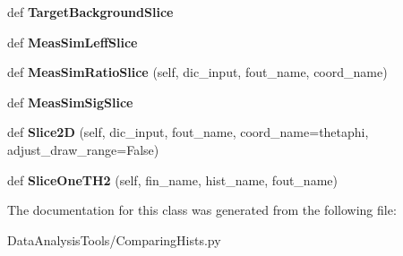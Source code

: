 \begin{DoxyCompactItemize}
def {\bfseries Target\+Background\+Slice}
\item 
\mbox{\label{classMIS_1_1DataAnalysisTools_1_1ComparingHists_1_1ComparingHists_a06127f45e5a7523111378ad284a61208}} 
def {\bfseries Meas\+Sim\+Leff\+Slice}
\item 
\mbox{\label{classMIS_1_1DataAnalysisTools_1_1ComparingHists_1_1ComparingHists_a617efeb49250118d28dad41acae134f1}} 
def {\bfseries Meas\+Sim\+Ratio\+Slice} (self, dic\+\_\+input, fout\+\_\+name, coord\+\_\+name)
\item 
\mbox{\label{classMIS_1_1DataAnalysisTools_1_1ComparingHists_1_1ComparingHists_a3ea1d8efafd5372cc971fe3d3e59bd36}} 
def {\bfseries Meas\+Sim\+Sig\+Slice}
\item 
\mbox{\label{classMIS_1_1DataAnalysisTools_1_1ComparingHists_1_1ComparingHists_a6aed004a95a78645c967ff6af1309130}} 
def {\bfseries Slice2D} (self, dic\+\_\+input, fout\+\_\+name, coord\+\_\+name=\textquotesingle{}thetaphi\textquotesingle{}, adjust\+\_\+draw\+\_\+range=False)
\item 
\mbox{\label{classMIS_1_1DataAnalysisTools_1_1ComparingHists_1_1ComparingHists_ab6fd655f2b0552c289fdae679e0c6e2e}} 
def {\bfseries Slice\+One\+T\+H2} (self, fin\+\_\+name, hist\+\_\+name, fout\+\_\+name)
\end{DoxyCompactItemize}


The documentation for this class was generated from the following file\+:\begin{DoxyCompactItemize}
\item 
Data\+Analysis\+Tools/Comparing\+Hists.\+py\end{DoxyCompactItemize}
